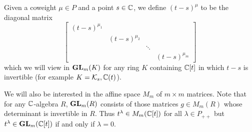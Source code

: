 \documentclass[draft]{article}
\begin{document}
Given a coweight $\mu \in P$ and a point $ s\in \mathbb C$, we define $ (t-s)^\mu$ to be the diagonal matrix 
\[
\begin{bmatrix}
    (t-s)^{\mu_1} \\
    & (t-s)^{\mu_2} \\ 
    & & \ddots \\
    & & & (t-s)^{\mu_m}
\end{bmatrix} 
\]
which we will view in ${\mathbf{GL}}_m(K) $ for any ring $ K $ containing $\mathbb C[t]$ in which $t-s$ is invertible (for example $ K = \mathcal K_s, \mathbb C(t)$). %


We will also be interested in the affine space $ M_m$ of $m\times m$ matrices.  Note that for any $ \mathbb C$-algebra $ R $, ${\mathbf{GL}}_m(R) $ consists of those matrices $ g \in M_m(R) $ whose determinant is invertible in $ R$. Thus $ t^\lambda \in M_m(\mathbb C[t])$ for all $ \lambda \in P_{++}$ but $ t^\lambda \in {\mathbf{GL}}_m(\mathbb C[t]) $ if and only if $ \lambda = 0 $.
\end{document}
